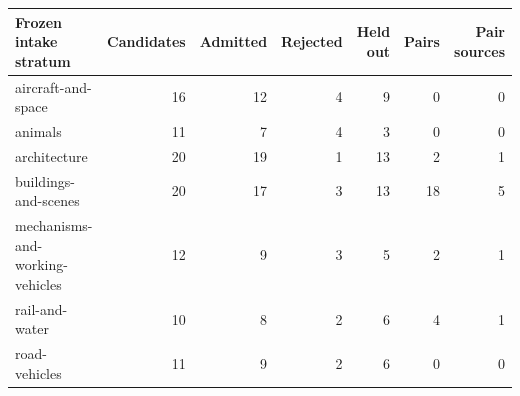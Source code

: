 \begin{tabular}{lrrrrrr}\toprule
Frozen intake stratum & Candidates & Admitted & Rejected & Held out & Pairs & Pair sources\\\midrule
aircraft-and-space & 16 & 12 & 4 & 9 & 0 & 0\\
animals & 11 & 7 & 4 & 3 & 0 & 0\\
architecture & 20 & 19 & 1 & 13 & 2 & 1\\
buildings-and-scenes & 20 & 17 & 3 & 13 & 18 & 5\\
mechanisms-and-working-vehicles & 12 & 9 & 3 & 5 & 2 & 1\\
rail-and-water & 10 & 8 & 2 & 6 & 4 & 1\\
road-vehicles & 11 & 9 & 2 & 6 & 0 & 0\\
\bottomrule\end{tabular}
